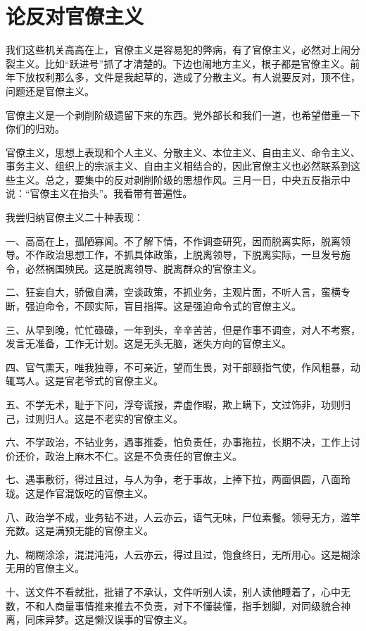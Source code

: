 \section[论反对官僚主义（一九六三年）]{论反对官僚主义}


我们这些机关高高在上，官僚主义是容易犯的弊病，有了官僚主义，必然对上闹分裂主义。比如“跃进号”抓了才清楚的。下边也闹地方主义，根子都是官僚主义。前年下放权利那么多，文件是我起草的，造成了分散主义。有人说要反对，顶不住，问题还是官僚主义。

官僚主义是一个剥削阶级遗留下来的东西。党外部长和我们一道，也希望借重一下你们的归劝。

官僚主义，思想上表现和个人主义、分散主义、本位主义、自由主义、命令主义、事务主义、组织上的宗派主义、自由主义相结合的，因此官僚主义也必然联系到这些主义。总之，要集中的反对剥削阶级的思想作风。三月一日，中央五反指示中说：“官僚主义在抬头”。我看带有普遍性。

我尝归纳官僚主义二十种表现：

一、高高在上，孤陋寡闻。不了解下情，不作调查研究，因而脱离实际，脱离领导。不作政治思想工作，不抓具体政策，上脱离领导，下脱离实际，一旦发号施令，必然祸国殃民。这是脱离领导、脱离群众的官僚主义。

二、狂妄自大，骄傲自满，空谈政策，不抓业务，主观片面，不听人言，蛮横专断，强迫命令，不顾实际，盲目指挥。这是强迫命令式的官僚主义。

三、从早到晚，忙忙碌碌，一年到头，辛辛苦苦，但是作事不调查，对人不考察，发言无准备，工作无计划。这是无头无脑，迷失方向的官僚主义。

四、官气熏天，唯我独尊，不可亲近，望而生畏，对干部颐指气使，作风粗暴，动辄骂人。这是官老爷式的官僚主义。

五、不学无术，耻于下问，浮夸谎报，弄虚作暇，欺上瞒下，文过饰非，功则归己，过则归人。这是不老实的官僚主义。

六、不学政治，不钻业务，遇事推委，怕负责任，办事拖拉，长期不决，工作上讨价还价，政治上麻木不仁。这是不负责任的官僚主义。

七、遇事敷衍，得过且过，与人为争，老于事故，上捧下拉，两面俱圆，八面玲珑。这是作官混饭吃的官僚主义。

八、政治学不成，业务钻不进，人云亦云，语气无味，尸位素餐。领导无方，滥竿充数。这是满预无能的官僚主义。

九、糊糊涂涂，混混沌沌，人云亦云，得过且过，饱食终日，无所用心。这是糊涂无用的官僚主义。

十、送文件不看就批，批错了不承认，文件听别人读，别人读他睡着了，心中无数，不和人商量事情推来推去不负责，对下不懂装懂，指手划脚，对同级貌合神离，同床异梦。这是懒汉误事的官僚主义。


